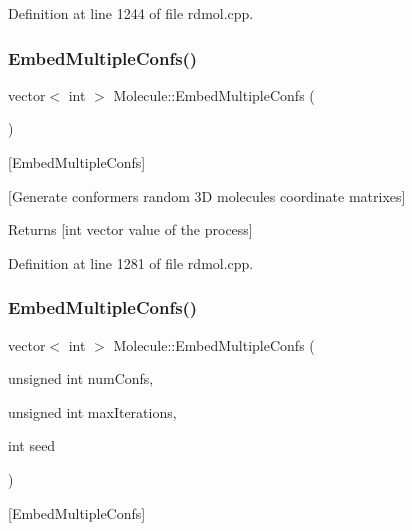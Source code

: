 Definition at line 1244 of file rdmol.\+cpp.

\mbox{\label{class_molecule_a05d32198715c54d6db4c139e4c9a3985}} 
\subsubsection{\texorpdfstring{Embed\+Multiple\+Confs()}{EmbedMultipleConfs()}\hspace{0.1cm}{\footnotesize\ttfamily [1/2]}}
{\footnotesize\ttfamily vector$<$ int $>$ Molecule\+::\+Embed\+Multiple\+Confs (\begin{DoxyParamCaption}{ }\end{DoxyParamCaption})}



\mbox{[}Embed\+Multiple\+Confs\mbox{]} 

\mbox{[}Generate conformers random 3D molecules coordinate matrixes\mbox{]} \begin{DoxyReturn}{Returns}
\mbox{[}int vector value of the process\mbox{]} 
\end{DoxyReturn}


Definition at line 1281 of file rdmol.\+cpp.

\mbox{\label{class_molecule_a3364337cff6c6a4d382f8653da23a54f}} 
\subsubsection{\texorpdfstring{Embed\+Multiple\+Confs()}{EmbedMultipleConfs()}\hspace{0.1cm}{\footnotesize\ttfamily [2/2]}}
{\footnotesize\ttfamily vector$<$ int $>$ Molecule\+::\+Embed\+Multiple\+Confs (\begin{DoxyParamCaption}\item[{unsigned int}]{num\+Confs,  }\item[{unsigned int}]{max\+Iterations,  }\item[{int}]{seed }\end{DoxyParamCaption})}



\mbox{[}Embed\+Multiple\+Confs\mbox{]} 

